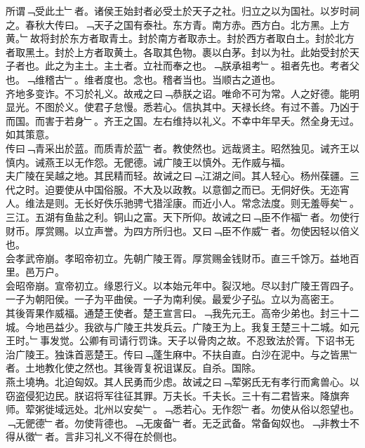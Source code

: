 \documentclass{zhvt-classic}
\begin{document}
\hspace*{2em}所谓﹁受此土﹂者。诸侯王始封者必受土於天子之社。归立之以为国社。以岁时祠之。春秋大传曰。﹁天子之国有泰社。东方青。南方赤。西方白。北方黑。上方黄。﹂故将封於东方者取青土。封於南方者取赤土。封於西方者取白土。封於北方者取黑土。封於上方者取黄土。各取其色物。裹以白茅。封以为社。此始受封於天子者也。此之为主土。主土者。立社而奉之也。﹁朕承祖考﹂。祖者先也。考者父也。﹁维稽古﹂。维者度也。念也。稽者当也。当顺古之道也。\\
\hspace*{2em}齐地多变诈。不习於礼义。故戒之曰﹁恭朕之诏。唯命不可为常。人之好德。能明显光。不图於义。使君子怠慢。悉若心。信执其中。天禄长终。有过不善。乃凶于而国。而害于若身﹂。齐王之国。左右维持以礼义。不幸中年早夭。然全身无过。如其策意。\\
\hspace*{2em}传曰﹁青采出於蓝。而质青於蓝﹂者。教使然也。远哉贤主。昭然独见。诫齐王以慎内。诫燕王以无作怨。无俷德。诫广陵王以慎外。无作威与福。\\
\hspace*{2em}夫广陵在吴越之地。其民精而轻。故诫之曰﹁江湖之间。其人轻心。杨州葆疆。三代之时。迫要使从中国俗服。不大及以政教。以意御之而已。无侗好佚。无迩宵人。维法是则。无长好佚乐驰骋弋猎淫康。而近小人。常念法度。则无羞辱矣﹂。三江。五湖有鱼盐之利。铜山之富。天下所仰。故诫之曰﹁臣不作福﹂者。勿使行财币。厚赏赐。以立声誉。为四方所归也。又曰﹁臣不作威﹂者。勿使因轻以倍义也。\\
\hspace*{2em}会孝武帝崩。孝昭帝初立。先朝广陵王胥。厚赏赐金钱财币。直三千馀万。益地百里。邑万户。\\
\hspace*{2em}会昭帝崩。宣帝初立。缘恩行义。以本始元年中。裂汉地。尽以封广陵王胥四子。一子为朝阳侯。一子为平曲侯。一子为南利侯。最爱少子弘。立以为高密王。\\
\hspace*{2em}其後胥果作威福。通楚王使者。楚王宣言曰。﹁我先元王。高帝少弟也。封三十二城。今地邑益少。我欲与广陵王共发兵云。广陵王为上。我复王楚三十二城。如元王时。﹂事发觉。公卿有司请行罚诛。天子以骨肉之故。不忍致法於胥。下诏书无治广陵王。独诛首恶楚王。传曰﹁蓬生麻中。不扶自直。白沙在泥中。与之皆黑﹂者。土地教化使之然也。其後胥复祝诅谋反。自杀。国除。\\
\hspace*{2em}燕土墝埆。北迫匈奴。其人民勇而少虑。故诫之曰﹁荤粥氏无有孝行而禽兽心。以窃盗侵犯边民。朕诏将军往征其罪。万夫长。千夫长。三十有二君皆来。降旗奔师。荤粥徙域远处。北州以安矣﹂。﹁悉若心。无作怨﹂者。勿使从俗以怨望也。﹁无俷德﹂者。勿使背德也。﹁无废备﹂者。无乏武备。常备匈奴也。﹁非教士不得从徵﹂者。言非习礼义不得在於侧也。\\
\end{document}
